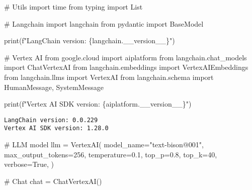 \documentclass[
  letterpaper,
  DIV=11,
  numbers=noendperiod]{scrreprt}
\newenvironment{Shaded}{\begin{snugshade}}{\end{snugshade}}
\newcommand{\BuiltInTok}[1]{\textcolor[rgb]{0.00,0.23,0.31}{#1}}
\newcommand{\CommentTok}[1]{\textcolor[rgb]{0.37,0.37,0.37}{#1}}
\newcommand{\DecValTok}[1]{\textcolor[rgb]{0.68,0.00,0.00}{#1}}
\newcommand{\FloatTok}[1]{\textcolor[rgb]{0.68,0.00,0.00}{#1}}
\newcommand{\ImportTok}[1]{\textcolor[rgb]{0.00,0.46,0.62}{#1}}
\newcommand{\NormalTok}[1]{\textcolor[rgb]{0.00,0.23,0.31}{#1}}
\newcommand{\OperatorTok}[1]{\textcolor[rgb]{0.37,0.37,0.37}{#1}}
\newcommand{\SpecialCharTok}[1]{\textcolor[rgb]{0.37,0.37,0.37}{#1}}
\newcommand{\SpecialStringTok}[1]{\textcolor[rgb]{0.13,0.47,0.30}{#1}}
\newcommand{\StringTok}[1]{\textcolor[rgb]{0.13,0.47,0.30}{#1}}
\newcommand{\VariableTok}[1]{\textcolor[rgb]{0.07,0.07,0.07}{#1}}
\begin{document}
\begin{Shaded}
\begin{Highlighting}[]
\CommentTok{\# Utils}
\ImportTok{import}\NormalTok{ time}
\ImportTok{from}\NormalTok{ typing }\ImportTok{import}\NormalTok{ List}

\CommentTok{\# Langchain}
\ImportTok{import}\NormalTok{ langchain}
\ImportTok{from}\NormalTok{ pydantic }\ImportTok{import}\NormalTok{ BaseModel}

\BuiltInTok{print}\NormalTok{(}\SpecialStringTok{f"LangChain version: }\SpecialCharTok{\{}\NormalTok{langchain}\SpecialCharTok{.}\NormalTok{\_\_version\_\_}\SpecialCharTok{\}}\SpecialStringTok{"}\NormalTok{)}

\CommentTok{\# Vertex AI}
\ImportTok{from}\NormalTok{ google.cloud }\ImportTok{import}\NormalTok{ aiplatform}
\ImportTok{from}\NormalTok{ langchain.chat\_models }\ImportTok{import}\NormalTok{ ChatVertexAI}
\ImportTok{from}\NormalTok{ langchain.embeddings }\ImportTok{import}\NormalTok{ VertexAIEmbeddings}
\ImportTok{from}\NormalTok{ langchain.llms }\ImportTok{import}\NormalTok{ VertexAI}
\ImportTok{from}\NormalTok{ langchain.schema }\ImportTok{import}\NormalTok{ HumanMessage, SystemMessage}

\BuiltInTok{print}\NormalTok{(}\SpecialStringTok{f"Vertex AI SDK version: }\SpecialCharTok{\{}\NormalTok{aiplatform}\SpecialCharTok{.}\NormalTok{\_\_version\_\_}\SpecialCharTok{\}}\SpecialStringTok{"}\NormalTok{)}
\end{Highlighting}
\end{Shaded}

\begin{verbatim}
LangChain version: 0.0.229
Vertex AI SDK version: 1.28.0
\end{verbatim}

\begin{Shaded}
\begin{Highlighting}[]
\CommentTok{\# LLM model}
\NormalTok{llm }\OperatorTok{=}\NormalTok{ VertexAI(}
\NormalTok{    model\_name}\OperatorTok{=}\StringTok{"text{-}bison@001"}\NormalTok{,}
\NormalTok{    max\_output\_tokens}\OperatorTok{=}\DecValTok{256}\NormalTok{,}
\NormalTok{    temperature}\OperatorTok{=}\FloatTok{0.1}\NormalTok{,}
\NormalTok{    top\_p}\OperatorTok{=}\FloatTok{0.8}\NormalTok{,}
\NormalTok{    top\_k}\OperatorTok{=}\DecValTok{40}\NormalTok{,}
\NormalTok{    verbose}\OperatorTok{=}\VariableTok{True}\NormalTok{,}
\NormalTok{)}

\CommentTok{\# Chat}
\NormalTok{chat }\OperatorTok{=}\NormalTok{ ChatVertexAI()}
\end{Highlighting}
\end{Shaded}
\end{document}
